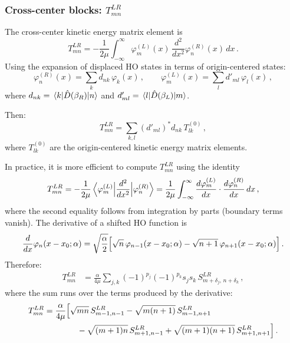 \subsubsection{Cross-center blocks: $T_{mn}^{LR}$}

The cross-center kinetic energy matrix element is
\begin{equation}
  T_{mn}^{LR} = -\frac{1}{2\mu}\int_{-\infty}^{\infty}\varphi_m^{(L)}(x)\,\frac{d^2}{dx^2}\varphi_n^{(R)}(x)\,dx\,.
\end{equation}
Using the expansion of displaced HO states in terms of origin-centered states:
\begin{equation}
  \varphi_n^{(R)}(x) = \sum_k d_{nk}\,\varphi_k(x)\,,\qquad
  \varphi_m^{(L)}(x) = \sum_l d'_{ml}\,\varphi_l(x)\,,
\end{equation}
where $d_{nk} = \mel{k}{\hat{D}(\beta_R)}{n}$ and $d'_{ml} = \mel{l}{\hat{D}(\beta_L)}{m}$.

Then:
\begin{equation}
  T_{mn}^{LR} = \sum_{k,l} (d'_{ml})^* d_{nk}\,T_{lk}^{(0)}\,,
\end{equation}
where $T_{lk}^{(0)}$ are the origin-centered kinetic energy matrix elements.

In practice, it is more efficient to compute $T_{mn}^{LR}$ using the identity
\begin{equation}
  T_{mn}^{LR} = -\frac{1}{2\mu}\mel{\varphi_m^{(L)}}{\frac{d^2}{dx^2}}{\varphi_n^{(R)}}
  = \frac{1}{2\mu}\int_{-\infty}^{\infty}\frac{d\varphi_m^{(L)}}{dx}\cdot\frac{d\varphi_n^{(R)}}{dx}\,dx\,,
\end{equation}
where the second equality follows from integration by parts (boundary terms vanish).
The derivative of a shifted HO function is
\begin{equation}
  \frac{d}{dx}\varphi_n(x-x_0;\alpha) = \sqrt{\frac{\alpha}{2}}\Bigl[\sqrt{n}\,\varphi_{n-1}(x-x_0;\alpha) - \sqrt{n+1}\,\varphi_{n+1}(x-x_0;\alpha)\Bigr]\,.
\end{equation}
Therefore:
\begin{align}
  T_{mn}^{LR}
  &= \frac{\alpha}{4\mu}\sum_{j,k}(-1)^{p_j}(-1)^{p_k}s_j s_k\,S^{LR}_{m+\delta_j,\,n+\delta_k}\,,
\end{align}
where the sum runs over the terms produced by the derivative:
\begin{align}
  T_{mn}^{LR}
  &= \frac{\alpha}{4\mu}\Bigl[
    \sqrt{mn}\,S_{m-1,n-1}^{LR}
    - \sqrt{m(n+1)}\,S_{m-1,n+1}^{LR}\notag\\
  &\qquad\qquad
    - \sqrt{(m+1)n}\,S_{m+1,n-1}^{LR}
    + \sqrt{(m+1)(n+1)}\,S_{m+1,n+1}^{LR}
  \Bigr]\,.
\end{align}

